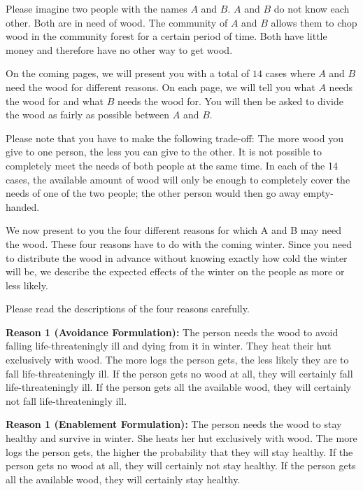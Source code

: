 \documentclass[10pt,letterpaper]{article}
\begin{document}
\noindent Please imagine two people with the names $A$ and $B$.
$A$ and $B$ do not know each other.
Both are in need of wood.
The community of $A$ and $B$ allows them to chop wood in the community forest for a certain period of time.
Both have little money and therefore have no other way to get wood.

On the coming pages, we will present you with a total of $14$ cases where $A$ and $B$ need the wood for different reasons.
On each page, we will tell you what $A$ needs the wood for and what $B$ needs the wood for.
You will then be asked to divide the wood as fairly as possible between $A$ and $B$.

Please note that you have to make the following trade-off:
The more wood you give to one person, the less you can give to the other.
It is not possible to completely meet the needs of both people at the same time.
In each of the 14 cases, the available amount of wood will only be enough to completely cover the needs of one of the two people; the other person would then go away empty-handed.

We now present to you the four different reasons for which A and B may need the wood.
These four reasons have to do with the coming winter.
Since you need to distribute the wood in advance without knowing exactly how cold the winter will be, we describe the expected effects of the winter on the people as more or less likely.

Please read the descriptions of the four reasons carefully.\vspace{2ex}

\noindent\textbf{Reason 1 (Avoidance Formulation):} The person needs the wood to avoid falling life-threateningly ill and dying from it in winter.
They heat their hut exclusively with wood.
The more logs the person gets, the less likely they are to fall life-threateningly ill.
If the person gets no wood at all, they will certainly fall life-threateningly ill.
If the person gets all the available wood, they will certainly not fall life-threateningly ill.\vspace{2ex}

\noindent\textbf{Reason 1 (Enablement Formulation):} The person needs the wood to stay healthy and survive in winter.
She heats her hut exclusively with wood.
The more logs the person gets, the higher the probability that they will stay healthy.
If the person gets no wood at all, they will certainly not stay healthy.
If the person gets all the available wood, they will certainly stay healthy.\vspace{2ex}
\end{document}
